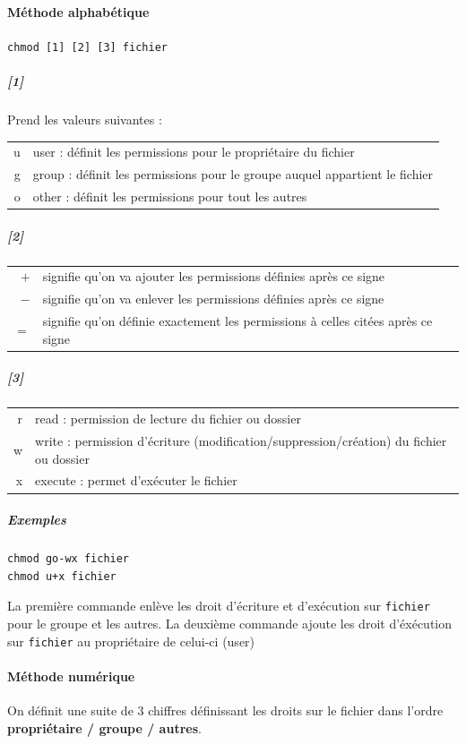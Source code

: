\documentclass[a4paper,twoside]{article}
\begin{document}
\paragraph{Méthode alphabétique}
\verb|chmod [1] [2] [3] fichier|
\subparagraph{[1]}
Prend les valeurs suivantes :
\begin{center}
\begin{tabular}{rl}
u & user : définit les permissions pour le propriétaire du fichier\\
g & group : définit les permissions pour le groupe auquel appartient le fichier\\
o & other : définit les permissions pour tout les autres
\end{tabular}
\end{center}

\subparagraph{[2]}
\begin{tabular}{rl}
$+$ & signifie qu'on va ajouter les permissions définies après ce signe\\
$-$ & signifie qu'on va enlever les permissions définies après ce signe\\
$=$ & signifie qu'on définie exactement les permissions à celles citées après ce signe
\end{tabular}

\subparagraph{[3]}

\begin{tabular}{rl}
r & read : permission de lecture du fichier ou dossier\\
w & write : permission d'écriture (modification/suppression/création) du fichier ou dossier\\
x & execute : permet d'exécuter le fichier
\end{tabular}

\subparagraph{Exemples}

\begin{verbatim}
chmod go-wx fichier
chmod u+x fichier
\end{verbatim}

La première commande enlève les droit d'écriture et d'exécution sur \texttt{fichier} pour le groupe et les autres. La deuxième commande ajoute les droit d'éxécution sur \texttt{fichier} au propriétaire de celui-ci (user)

\paragraph{Méthode numérique}
On définit une suite de 3 chiffres définissant les droits sur le fichier dans l'ordre \textbf{propriétaire / groupe / autres}.
\end{document}
